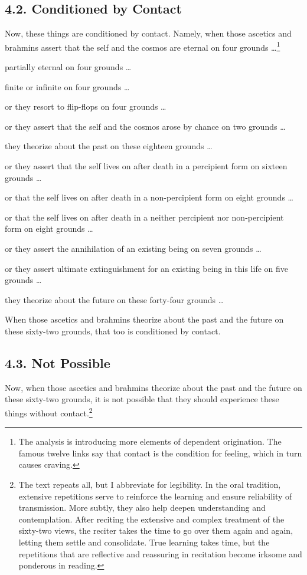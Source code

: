 \documentclass[12pt,openany]{book}%
\begin{document}
\subsection*{4.2. Conditioned by Contact }

Now, these things are conditioned by contact. Namely, when those ascetics and brahmins assert that the self and the cosmos are eternal on four grounds …\footnote{The analysis is introducing more elements of dependent origination. The famous twelve links say that contact is the condition for feeling, which in turn causes craving. } 

partially eternal on four grounds … 

finite or infinite on four grounds … 

or they resort to flip-flops on four grounds … 

or they assert that the self and the cosmos arose by chance on two grounds … 

they theorize about the past on these eighteen grounds … 

or they assert that the self lives on after death in a percipient form on sixteen grounds … 

or that the self lives on after death in a non-percipient form on eight grounds … 

or that the self lives on after death in a neither percipient nor non-percipient form on eight grounds … 

or they assert the annihilation of an existing being on seven grounds … 

or they assert ultimate extinguishment for an existing being in this life on five grounds … 

they theorize about the future on these forty-four grounds … 

When those ascetics and brahmins theorize about the past and the future on these sixty-two grounds, that too is conditioned by contact. 

\subsection*{4.3. Not Possible }

Now, when those ascetics and brahmins theorize about the past and the future on these sixty-two grounds, it is not possible that they should experience these things without contact.\footnote{The text repeats all, but I abbreviate for legibility. In the oral tradition, extensive repetitions serve to reinforce the learning and ensure reliability of transmission. More subtly, they also help deepen understanding and contemplation. After reciting the extensive and complex treatment of the sixty-two views, the reciter takes the time to go over them again and again, letting them settle and consolidate. True learning takes time, but the repetitions that are reflective and reassuring in recitation become irksome and ponderous in reading. } 
\end{document}
